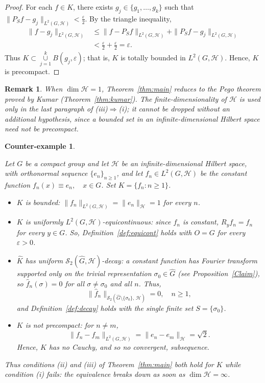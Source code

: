 \documentclass[10pt,a4paper]{amsart}
\newtheorem{remark}[theorem]{Remark}
\newtheorem{counterexample}[theorem]{Counter-example}
\def\union{\mathop{\cup }}
\begin{document}
\begin{proof}
For each $f\in K$, there exists  $g_j\in \{g_1,\dots,g_k\}$ such that $\|P_Sf-g_j\|_{L^2(G,\mathcal{H})}<\frac{\varepsilon}{2}$. By the
triangle inequality, 
\begin{align*}
\|f-g_j\|_{L^2(G,\mathcal{H})}&\le\|f-P_Sf\|_{L^2(G,\mathcal{H})}+\|P_Sf-g_j\|_{L^2(G,\mathcal{H})}\\
&<\frac{\varepsilon}{2}+\frac{\varepsilon}{2}=\varepsilon.
\end{align*}
Thus $K\subset\union\limits_{j=1}^kB(g_j,\varepsilon)$; that is,  $K$ is totally bounded in
$L^2(G,\mathcal{H})$. Hence, $K$ is precompact.
\end{proof}

\begin{remark}{\rm
When $\dim\mathcal{H}=1$, Theorem~\ref{thm:main} reduces to the Pego theorem proved by  Kumar (Theorem~\ref{thm:kumar}).
The finite-dimensionality of $\mathcal{H}$ is used only in the last paragraph of
(iii)$\Rightarrow$(i); it cannot be dropped without an additional hypothesis, since a
bounded set in an infinite-dimensional Hilbert space need not be precompact.
}\end{remark}



\begin{counterexample}\label{ex:counterexample}{\rm
Let $G$ be a compact group and  let $\mathcal{H}$ be an {\it infinite-dimensional} Hilbert space, with orthonormal sequence
$\{e_n\}_{n\ge1}$, and let $f_n\in L^2(G,\mathcal{H})$ be the constant function
$f_n(x)\equiv e_n,\quad x\in G$. Set $K=\{f_n : n\ge1\}$.

\begin{itemize}
\item $K$ is bounded: $\|f_n\|_{L^2(G,\mathcal{H})}=\|e_n\|_\mathcal{H}=1$ for every $n$.

\item $K$ is uniformly $L^2(G,\mathcal{H})$-equicontinuous: since $f_n$ is
constant, $R_yf_n=f_n$ for every $y\in G$. So,  Definition~\ref{def:equicont} holds with
$O=G$ for every $\varepsilon>0$.

\item $\widehat K$ has uniform $\mathscr{S}_2(\widehat{G},\mathcal{H})$-decay: a constant
function has Fourier transform supported only on the trivial representation
$\sigma_0\in\widehat{G}$ (see Proposition~\ref{Claim}), so $\widehat f_n(\sigma)=0$ for all $\sigma\ne\sigma_0$ and all $n$. Thus, 
$$
\|\widehat f_n\|_{\mathscr{S}_2(\widehat{G}\setminus\{\sigma_0\},\,\mathcal{H})}=0,\quad n\ge1,
$$
and Definition~\ref{def:decay} holds with the single finite set $S=\{\sigma_0\}$.

\item $K$ is not precompact: for $n\ne m$,
$$
\|f_n-f_m\|_{L^2(G,\mathcal{H})}=\|e_n-e_m\|_\mathcal{H}=\sqrt2.
$$
 Hence, $K$ has no Cauchy, and so no convergent, subsequence.
\end{itemize}
\noindent  Thus conditions (ii) and (iii) of Theorem~\ref{thm:main} both hold for $K$ while
condition (i) fails: the equivalence breaks down as soon as $\dim\mathcal{H}=\infty$.
}\end{counterexample}
\end{document}
